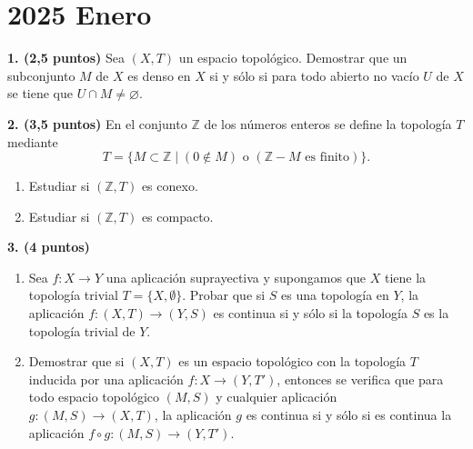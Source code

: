 \clearpage
\chapter*{2025 Enero}

\begin{enunciado}
    \hypertarget{2025 A 1}{}
    \textbf{1. (2,5 puntos)} Sea \((X,T)\) un espacio topológico. Demostrar que un subconjunto \(M\) de \(X\) es denso en \(X\) si y sólo si para todo abierto no vacío \(U\) de \(X\) se tiene que \(U \cap M \neq \varnothing\).
\end{enunciado}

\begin{enunciado}
    \hypertarget{2025 A 2}{}
    \textbf{2. (3,5 puntos)} En el conjunto \(\mathbb{Z}\) de los números enteros se define la topología \(T\) mediante
    \[
        T = \{M \subset \mathbb{Z} \mid (0 \notin M) \text{ o } (\mathbb{Z} - M \text{ es finito})\}.
    \]
    \begin{enumerate}[label=\alph*)]
        \item Estudiar si \((\mathbb{Z},T)\) es conexo.
        \item Estudiar si \((\mathbb{Z},T)\) es compacto. 
    \end{enumerate}
\end{enunciado}

\begin{enunciado}
    \hypertarget{2025 A 3}{}
    \textbf{3. (4 puntos)}
    \begin{enumerate}[label=\alph*)]
        \item Sea \(f : X \to Y\) una aplicación suprayectiva y supongamos que \(X\) tiene la topología trivial \(T = \{X,\emptyset\}\). Probar que si \(S\) es una topología en \(Y\), la aplicación \(f : (X,T) \to (Y,S)\) es continua si y sólo si la topología \(S\) es la topología trivial de \(Y\).
        \item Demostrar que si \((X,T)\) es un espacio topológico con la topología \(T\) inducida por una aplicación \(f : X \to (Y,T')\), entonces se verifica que para todo espacio topológico \((M,S)\) y cualquier aplicación \(g : (M,S) \to (X,T)\), la aplicación \(g\) es continua si y sólo si es continua la aplicación \(f \circ g : (M,S) \to (Y,T')\).
    \end{enumerate}
\end{enunciado}